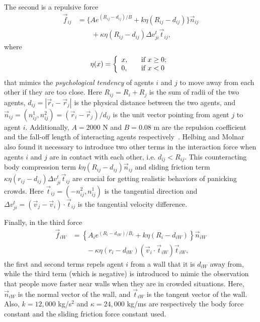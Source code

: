 The second is a repulsive force
\begin{equation}\label{eqn:repulhuman}
\begin{split}
\vec{f}_{ij} &= \lbrace A e^{(R_{ij} - d_{ij})/B} + k \eta(R_{ij}-d_{ij}) \rbrace\vec{n}_{ij} \\
&\qquad+ \kappa \eta(R_{ij}-d_{ij}) \Delta v^t_{ji}\vec{t}_{ij},
\end{split}
\end{equation}
where
\begin{equation}
\eta(x) = \left\{
  \begin{array}{l l}
    x, & \quad \text{if $x \geq 0$};\\
    0, & \quad \text{if $x < 0$}\\
  \end{array} \right.
\end{equation}
that mimics the \emph{psychological tendency} of agents $i$ and $j$ to move away from each other if they are too close. Here $R_{ij} = R_i + R_j$ is the sum of radii of the two agents, $d_{ij} = |\vec{r}_i - \vec{r}_j|$ is the physical distance between the two agents, and $\vec{n}_{ij} = (n^1_{ij},n^2_{ij}) = (\vec{r}_i-\vec{r}_j)/d_{ij}$ is the unit vector pointing from agent $j$ to agent $i$. Additionally, $A = 2000$ N and $B = 0.08$ m are the repulsion coefficient and the fall-off length of interacting agents respectively~\cite{Helbing:2000ef}. Helbing and Molnar also found it necessary to introduce two other terms in the interaction force when agents $i$ and $j$ are in contact with each other, i.e. $d_{ij} < R_{ij}$. This counteracting body compression term $k \eta(R_{ij}-d_{ij})\vec{n}_{ij}$ and sliding friction term $\kappa \eta(r_{ij}-d_{ij})\Delta v^t_{ji}\vec{t}_{ij}$ are crucial for getting realistic behaviors of panicking crowds. Here $\vec{t}_{ij} = (-n^2_{ij},n^1_{ij})$ is the tangential direction and $\Delta v^t_{ji} = (\vec{v}_j-\vec{v}_i)\cdot\vec{t}_{ij}$ is the tangential velocity difference.

Finally, in the third force
\begin{equation}\label{eqn:repulwall}
\begin{split}
\vec{f}_{iW} &= \left\{ A_i e^{(R_{i}-d_{iW})/B_i}+ k \eta(R_i - d_{iW}) \right\}\vec{n}_{iW} \\
&\qquad - \kappa \eta(r_i-d_{iW})(\vec{v}_i\cdot\vec{t}_{iW})\vec{t}_{iW},
\end{split}
\end{equation}
the first and second terms repels agent $i$ from a wall that it is $d_{iW}$ away from, while the third term (which is negative) is introduced to mimic the observation that people move faster near walls when they are in crowded situations. Here, $\vec{n}_{iW}$ is the normal vector of the wall, and $\vec{t}_{iW}$ is the tangent vector of the wall. Also, $k=12,000$ kg/s$^{2}$ and $\kappa=24,000$ kg/ms are respectively the body force constant and the sliding friction force constant used.

